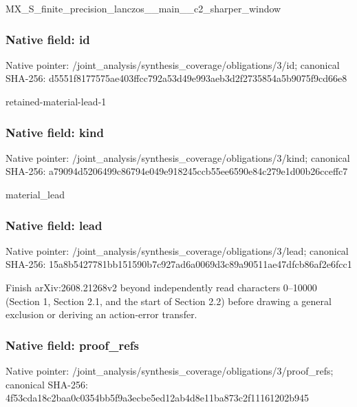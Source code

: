 \documentclass[10pt,a4paper]{article}
\begin{document}
\begingroup\raggedright\sloppy MX\_\allowbreak{}S\_\allowbreak{}finite\_\allowbreak{}precision\_\allowbreak{}lanczos\_\allowbreak{}\_\allowbreak{}main\_\allowbreak{}\_\allowbreak{}c2\_\allowbreak{}sharper\_\allowbreak{}window\par\endgroup

\subsubsection{Native field: id}
Native pointer: /joint\_\allowbreak{}analysis/synthesis\_\allowbreak{}coverage/obligations/3/id; canonical SHA-256: d5551f8177575ae403ffcc792a53d49e993aeb3d2f2735854a5b9075f9cd66e8

\begingroup\raggedright\sloppy retained-material-lead-1\par\endgroup

\subsubsection{Native field: kind}
Native pointer: /joint\_\allowbreak{}analysis/synthesis\_\allowbreak{}coverage/obligations/3/kind; canonical SHA-256: a79094d5206499c86794e049e918245ccb55ee6590e84c279e1d00b26cceffc7

\begingroup\raggedright\sloppy material\_\allowbreak{}lead\par\endgroup

\subsubsection{Native field: lead}
Native pointer: /joint\_\allowbreak{}analysis/synthesis\_\allowbreak{}coverage/obligations/3/lead; canonical SHA-256: 15a8b5427781bb151590b7c927ad6a0069d3c89a90511ae47dfcb86af2e6fcc1

\begingroup\raggedright\sloppy Finish arXiv:\allowbreak{}2608.21268v2 beyond independently read characters 0{\AtlasUnicodeText –}\allowbreak{}10000 (Section 1,\allowbreak{} Section 2.1,\allowbreak{} and the start of Section 2.2) before drawing a general exclusion or deriving an action-error transfer.\par\endgroup

\subsubsection{Native field: proof\_\allowbreak{}refs}
Native pointer: /joint\_\allowbreak{}analysis/synthesis\_\allowbreak{}coverage/obligations/3/proof\_\allowbreak{}refs; canonical SHA-256: 4f53cda18c2baa0c0354bb5f9a3ecbe5ed12ab4d8e11ba873c2f11161202b945
\end{document}
